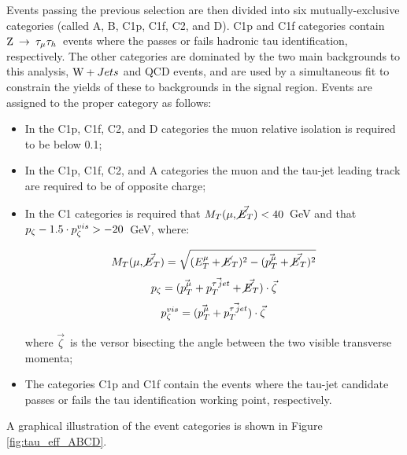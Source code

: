 Events passing the previous selection are then divided into six mutually-exclusive categories (called A, B, C1p, C1f, C2, and D). C1p and C1f categories contain $\mathrm{Z}\:\rightarrow\:\tau_\mu\tau_h$\ events where the \tauh passes or fails hadronic tau identification, respectively. The other categories are dominated by the two main backgrounds to this analysis, $\mathrm{W}+Jets$ and QCD events, and are used by a simultaneous fit to constrain the yields of these to backgrounds in the signal region.
Events are assigned to the proper category as follows: %
\begin{itemize}
\item In the C1p, C1f, C2, and D categories the muon relative isolation is required to be below 0.1;
\item In the C1p, C1f, C2, and A categories the muon and the tau-jet leading track are required to be of opposite charge;
\item In the C1 categories is required that $M_T(\mu, \vec{\cancel{E}_T}) < 40$\ GeV and that $p_\zeta -1.5 \cdot p_\zeta^{vis} > -20$\ GeV, where:

\begin{equation}
 M_T(\mu, \vec{\cancel{E}_T}) = \sqrt{(E_{T}^\mu+\cancel{E}_T)^2 - (\vec{p_{T}^\mu}+\vec{\cancel{E}_T})^2}
\end{equation}
\begin{equation}
 p_\zeta = (\vec{p_{T}^\mu} + \vec{p_{T}^{\tau\,jet}} + \vec{\cancel{E}_T}) \cdot \vec{\zeta}
\end{equation}
\begin{equation}
 p_\zeta^{vis} = (\vec{p_{T}^\mu} + \vec{p_{T}^{\tau\,jet}}) \cdot \vec{\zeta}
\end{equation}

where $\vec{\zeta}$\ is the versor bisecting the angle between the two visible transverse momenta;
\item The categories C1p and C1f contain the events where the tau-jet candidate passes or fails the tau identification working point, respectively.
\end{itemize}

A graphical illustration of the event categories is shown in Figure \ref{fig:tau_eff_ABCD}.


